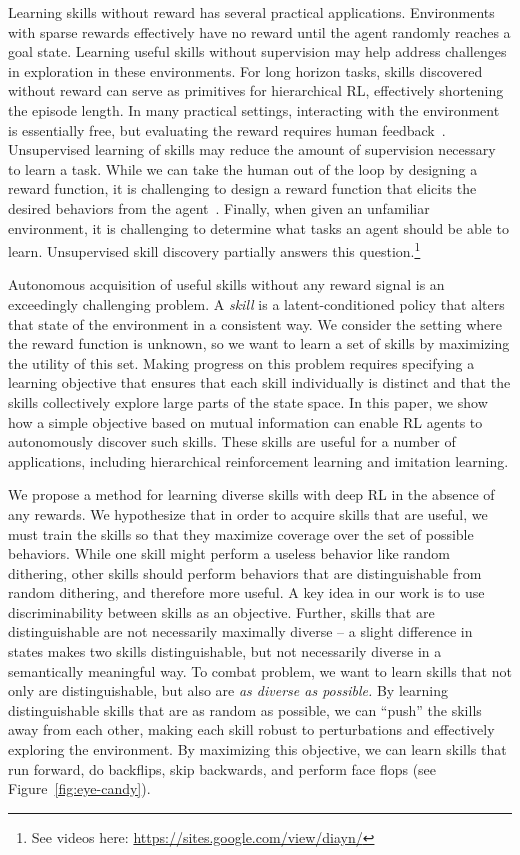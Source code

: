 \documentclass{article} %
\theoremstyle{questionstyle}\newtheorem{question}{Question}
\begin{document}
Learning skills without reward has several practical applications.
Environments with sparse rewards effectively have no reward until the agent randomly reaches a goal state. Learning useful skills without supervision may help address challenges in exploration in these environments.
For long horizon tasks, skills discovered without reward can serve as primitives for hierarchical RL, effectively shortening the episode length.
In many practical settings, interacting with the environment is essentially free, but evaluating the reward requires human feedback~\citep{christiano2017deep}. Unsupervised learning of skills may reduce the amount of supervision necessary to learn a task.
While we can take the human out of the loop by designing a reward function, it is challenging to design a reward function that elicits the desired behaviors from the agent~\citep{hadfield2017inverse}.
Finally, when given an unfamiliar environment, it is challenging to determine what tasks an agent should be able to learn. Unsupervised skill discovery partially answers this question.\footnote{See videos here: \small{\url{https://sites.google.com/view/diayn/}}}

Autonomous acquisition of useful skills without any reward signal is an exceedingly challenging problem.
A \emph{skill} is a latent-conditioned policy that alters that state of the environment in a consistent way. We consider the setting where the reward function is unknown, so we want to learn a set of skills by maximizing the utility of this set.
Making progress on this problem requires specifying a learning objective that ensures that each skill individually is distinct and that the skills collectively explore large parts of the state space.
In this paper, we show how a simple objective based on mutual information can enable RL agents to autonomously discover such skills. These skills are useful for a number of applications, including hierarchical reinforcement learning and imitation learning.

We propose a method for learning diverse skills with deep RL in the absence of any rewards.
We hypothesize that  in order to acquire skills that are useful, we must train the skills so that they maximize coverage over the set of possible behaviors. While one skill might perform a useless behavior like random dithering, other skills should perform behaviors that are distinguishable from random dithering, and therefore more useful.
A key idea in our work is to use discriminability between skills as an objective.
Further, skills that are distinguishable are not necessarily maximally diverse -- a slight difference in states makes two skills distinguishable, but not necessarily diverse in a semantically meaningful way.
To combat problem, we want to learn skills that not only are distinguishable, but also are \emph{as diverse as possible.} By learning distinguishable skills that are as random as possible, we can ``push'' the skills away from each other, making each skill robust to perturbations and effectively exploring the environment.
By maximizing this objective, we can learn skills that run forward, do backflips, skip backwards, and perform face flops (see Figure~\ref{fig:eye-candy}).
\end{document}
